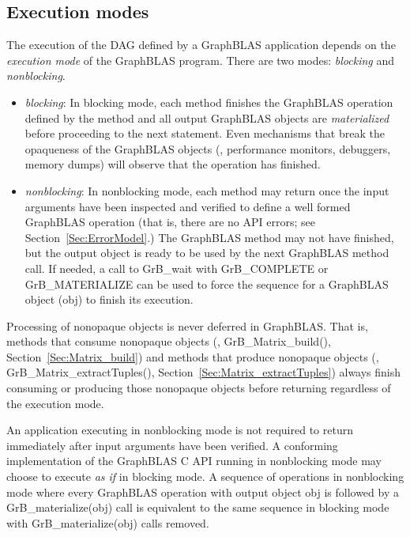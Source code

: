 \subsection{Execution modes}
\label{Sec:Modes}

The execution of the DAG defined by a GraphBLAS application depends on the
\emph{execution mode} of the GraphBLAS program.  There are two modes:
\emph{blocking} and \emph{nonblocking}.

\begin{itemize}

\item \emph{blocking}: In blocking mode, each method finishes the
GraphBLAS operation defined by the method and all output GraphBLAS
objects are \emph{materialized} before proceeding to the
next statement.  Even mechanisms that break the opaqueness of the
GraphBLAS objects (\eg, performance monitors, debuggers, memory dumps)
will observe that the operation has finished.

\item \emph{nonblocking}: In nonblocking mode, each method may return
once the input arguments have been inspected and verified to define
a well formed GraphBLAS operation (that is, there are no API errors;
see Section~\ref{Sec:ErrorModel}.) The GraphBLAS method may not have
finished, but the output object is ready to be used by the next GraphBLAS
method call.  If needed, a call to {\sf GrB\_wait} with {\sf GrB\_COMPLETE} or  {\sf GrB\_MATERIALIZE} 
can be used to force the sequence for a GraphBLAS object ({\sf obj}) to finish its execution.

\end{itemize}

Processing of nonopaque objects is never deferred in
GraphBLAS. That is, methods that consume nonopaque objects (\eg, {\sf
GrB\_Matrix\_build()}, Section~\ref{Sec:Matrix_build}) and methods that
produce nonopaque objects (\eg, {\sf GrB\_Matrix\_extractTuples()},
Section~\ref{Sec:Matrix_extractTuples}) always finish consuming or
producing those nonopaque objects before returning regardless of the 
execution mode.

An application executing in nonblocking mode is not required to return
immediately after input arguments have been verified. A conforming
implementation of the GraphBLAS C API running in nonblocking mode may
choose to execute {\it as if} in blocking mode.  A sequence of operations
in nonblocking mode where every GraphBLAS operation with output object
{\sf obj} is followed by a {\sf GrB\_materialize(obj)} call is equivalent to the
same sequence in blocking mode with {\sf GrB\_materialize(obj)} calls removed.

